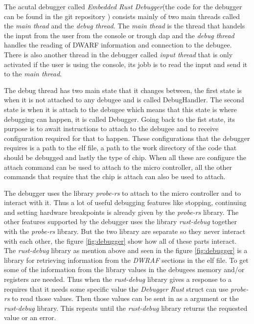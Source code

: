 The acutal debugger called \emph{Embedded Rust Debugger}(the code for the debugger can be found in the git repository \cite{erd}) consists mainly of two main threads called the \emph{main thead} and the \emph{debug thread}.
The \emph{main thead} is the thread that handels the input from the user from the console or trough \gls{dap} and the \emph{debug thread} handles the reading of \gls{DWARF} information and connection to the \gls{debugee}.
There is also another thread in the debugger called \emph{input thread} that is only activated if the user is using the console, its jobb is to read the input and send it to the \emph{main thread}.


The debug thread has two main state that it changes between, the first state is when it is not attached to any \gls{debugee} and is called DebugHandler.
The second state is when it is attach to the \gls{debugee} which means that this state is where debugging can happen, it is called Debugger.
Going back to the fist state, its purpose is to await instructions to attach to the \gls{debugee} and to receive configuration required for that to happen.
These configurations that the debugger requires is a path to the elf file, a path to the work directory of the code that should be debugged and lastly the type of chip.
When all these are configure the attach command can be used to attach to the micro controller, all the other commands that require that the chip is attach can also be used to attach.


The debugger uses the library \emph{probe-rs} \cite{probe} to attach to the micro controller and to interact with it.
Thus a lot of useful debugging features like stopping, continuing and setting hardware breakpoints is already given by the \emph{probe-rs} library.
The other features supported by the debugger uses the library \emph{rust-debug} together with the \emph{probe-rs} library.
But the two library are separate so they never interact with each other, the figure \ref{fig:debugger} show how all of these parts interact.
The \emph{rust-debug} library as mention above and seen in the figure \ref{fig:debugger} is a library for retrieving information from the \emph{DWRAF} sections in the \gls{elf} file.
To get some of the information from the library values in the \glspl{debugee} memory and/or registers are needed.
Thus when the \emph{rust-debug} library gives a response to a requires that it needs some specific value the \emph{Debugger} \emph{Rust} struct can use \emph{probe-rs} to read those values.
Then those values can be sent in as a argument or the \emph{rust-debug} library.
This repeats until the \emph{rust-debug} library returns the requested value or an error.


